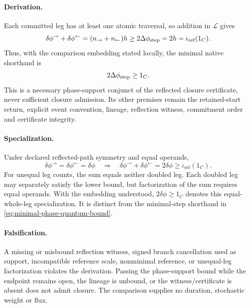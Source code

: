 \paragraph{Derivation.}
Each committed leg has at least one atomic traversal, so addition in
\(\mathcal L\) gives
\begin{equation}
\delta\phi^{\rightarrow}+\delta\phi^{\leftarrow}
=(n_{\rightarrow}+n_{\leftarrow})h
\ge2\Delta\phi_{\rm step}=2h=\iota_{\mathrm{ref}}(1_C).
\label{eq:reflected-leg-bound}
\end{equation}
Thus, with the comparison embedding stated locally, the minimal native
shorthand is
\begin{equation}
2\Delta\phi_{\rm step}\ge1_C.
\label{eq:minimal-phase-quantum-bound}
\end{equation}
This is a necessary phase-support conjunct of the reflected closure
certificate, never sufficient closure admission. Its other premises remain
the retained-start return, explicit event convention, lineage, reflection
witness, commitment order and certificate integrity.

\paragraph{Specialization.}
Under declared reflected-path symmetry and equal operands,
\begin{equation}
\delta\phi^{\rightarrow}=\delta\phi^{\leftarrow}=\delta\phi
\quad\Longrightarrow\quad
\delta\phi^{\rightarrow}+\delta\phi^{\leftarrow}=2\delta\phi
\ge\iota_{\mathrm{ref}}(1_C).
\label{eq:equal-leg-factorization}
\end{equation}
For unequal leg counts, the sum equals neither doubled leg. Each doubled
leg may separately satisfy the lower bound, but factorization of the sum
requires equal operands. With the embedding understood, \(2\delta\phi\ge1_C\)
denotes this equal-whole-leg specialization. It is distinct from the
minimal-step shorthand in \eqref{eq:minimal-phase-quantum-bound}.

\paragraph{Falsification.}
A missing or misbound reflection witness, signed branch cancellation used as
support, incompatible reference scale, nonminimal reference, or unequal-leg
factorization violates the derivation. Passing the phase-support bound while
the endpoint remains open, the lineage is unbound, or the witness/certificate
is absent does not admit closure. The comparison supplies no duration,
stochastic weight or flux.

